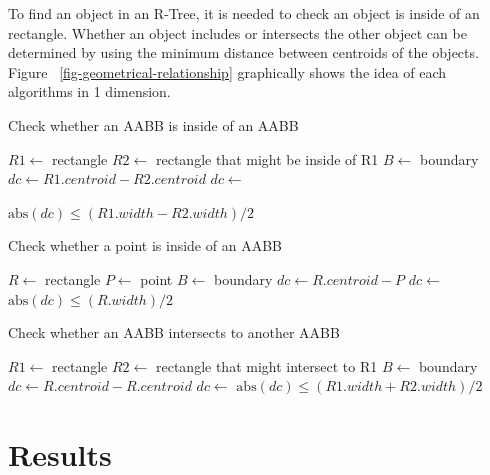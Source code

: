 \documentclass[10pt,letterpaper,twocolumn]{article}
\begin{document}
To find an object in an R-Tree, it is needed to check an object is inside of
an rectangle. Whether an object includes or intersects the other object can be
determined by using the minimum distance between centroids of the objects.
Figure ~\ref{fig-geometrical-relationship} graphically shows the idea of each
algorithms in 1 dimension.

\begin{algorithm}
    \caption{Check whether an AABB is inside of an AABB}
    \begin{algorithmic}
        \State $R1 \gets$ rectangle
        \State $R2 \gets$ rectangle that might be inside of R1
        \State $B  \gets$ boundary
            \State $dc \gets R1.centroid - R2.centroid$
            \State $dc \gets$ 

            \State \Return $\mathrm{abs}(dc) \leq (R1.width - R2.width) / 2$
        \EndFunction
     \end{algorithmic}
\end{algorithm}

\begin{algorithm}
    \caption{Check whether a point is inside of an AABB}
    \begin{algorithmic}
        \State $R \gets$ rectangle
        \State $P \gets$ point
        \State $B \gets$ boundary
            \State $dc \gets R.centroid - P$
            \State $dc \gets$ 
            \State \Return $\mathrm{abs}(dc) \leq (R.width) / 2$
        \EndFunction
     \end{algorithmic}
\end{algorithm}

\begin{algorithm}
    \caption{Check whether an AABB intersects to another AABB}
    \begin{algorithmic}
        \State $R1 \gets$ rectangle
        \State $R2 \gets$ rectangle that might intersect to R1
        \State $B  \gets$ boundary
            \State $dc \gets R.centroid - R.centroid$
            \State $dc \gets$ 
            \State \Return $\mathrm{abs}(dc) \leq (R1.width + R2.width) / 2$
        \EndFunction
     \end{algorithmic}
\end{algorithm}

\section*{Results}
\end{document}
